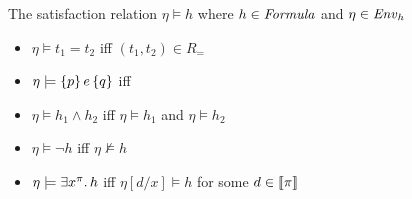 \documentclass[12pt,a4paper]{report}
\begin{document}
\noindent The satisfaction relation $\eta \models h$ where $h \in \mathit{Formula}$ and $\eta \in \mathit{Env}_h$
\begin{itemize}
  \item $\eta \models t_1 = t_2$ iff $(t_1,t_2) \in R_=$

  \item $\eta \models \{p\}\,e\,\{q\}$ iff

  \item $\eta \models h_1 \wedge h_2$ iff $\eta \models h_1$ and $\eta \models h_2$

  \item $\eta \models \neg h$ iff $\eta \not\models h$
  
  \item $\eta \models \exists x^\pi.\,h$ iff $\eta[d/x] \models h$ for some $d \in \llbracket\pi\rrbracket$
\end{itemize}
\end{document}

